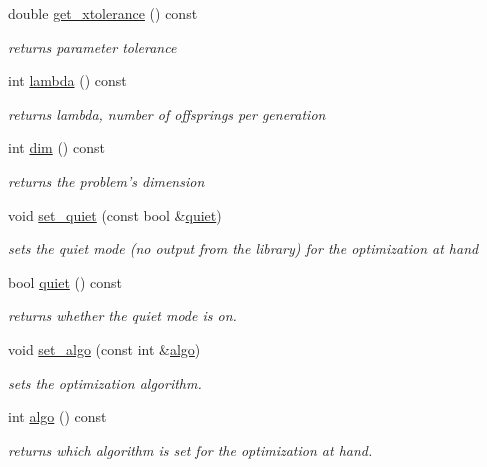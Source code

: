 \begin{DoxyCompactItemize}
double \hyperlink{classlibcmaes_1_1Parameters_a75b95a875008a0216038d43369cd9171}{get\-\_\-xtolerance} () const 
\begin{DoxyCompactList}\small\item\em returns parameter tolerance \end{DoxyCompactList}\item 
int \hyperlink{classlibcmaes_1_1Parameters_a3d569987e9a5eb61bc781ee75b2ab18a}{lambda} () const 
\begin{DoxyCompactList}\small\item\em returns lambda, number of offsprings per generation \end{DoxyCompactList}\item 
int \hyperlink{classlibcmaes_1_1Parameters_a95a3c04400a77d134bb1e9705189a24e}{dim} () const 
\begin{DoxyCompactList}\small\item\em returns the problem's dimension \end{DoxyCompactList}\item 
void \hyperlink{classlibcmaes_1_1Parameters_ae93cf5c15dbe42b19339b26b1c57f872}{set\-\_\-quiet} (const bool \&\hyperlink{classlibcmaes_1_1Parameters_a8562a739088f9f9f466b8d658084c9f7}{quiet})
\begin{DoxyCompactList}\small\item\em sets the quiet mode (no output from the library) for the optimization at hand \end{DoxyCompactList}\item 
bool \hyperlink{classlibcmaes_1_1Parameters_a8562a739088f9f9f466b8d658084c9f7}{quiet} () const 
\begin{DoxyCompactList}\small\item\em returns whether the quiet mode is on. \end{DoxyCompactList}\item 
void \hyperlink{classlibcmaes_1_1Parameters_aeb869d18fa0c987f56216d9bfa1f1a0d}{set\-\_\-algo} (const int \&\hyperlink{classlibcmaes_1_1Parameters_a985b2cd8249360dd70d34a1e3434f457}{algo})
\begin{DoxyCompactList}\small\item\em sets the optimization algorithm. \end{DoxyCompactList}\item 
int \hyperlink{classlibcmaes_1_1Parameters_a985b2cd8249360dd70d34a1e3434f457}{algo} () const 
\begin{DoxyCompactList}\small\item\em returns which algorithm is set for the optimization at hand. \end{DoxyCompactList}\item 

\end{DoxyCompactItemize}
